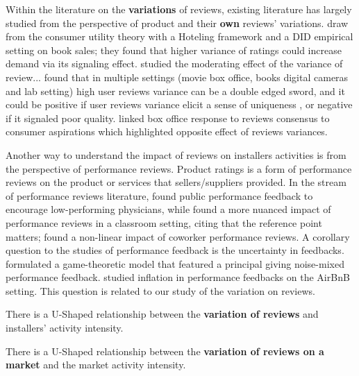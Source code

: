 \documentclass[mnsc,blindrev]{informs3} %
\begin{document}
Within the literature on the \textbf{variations} of reviews, existing literature has largely studied from the perspective of product and their \textbf{own} reviews' variations. \cite{sun2012does} draw from the consumer utility theory with a Hoteling framework and a DID empirical setting on book sales; they found that higher variance of ratings could increase demand via its signaling effect. \cite{yi2019leveraging} studied the moderating effect of the variance of review... \cite{wang2015user} found that in multiple settings (movie box office, books  digital cameras and lab setting) high user reviews variance can be a double edged sword, and it could be positive if user reviews variance elicit a sense of uniqueness , or negative if it signaled poor quality. \cite{west1998integrating} linked box office response to reviews consensus to consumer aspirations which highlighted opposite effect of reviews variances.  

Another way to understand the impact of reviews on installers activities is from the perspective of performance reviews.  Product ratings is a form of performance reviews on the product or services that sellers/suppliers provided. In the stream of performance reviews literature, \cite{song2017closing} found public performance feedback to encourage low-performing physicians, while \cite{eyring2018performance} found a more nuanced impact of performance reviews in a classroom setting, citing that the reference point matters;  \cite{tan2019you} found a non-linear impact of coworker performance reviews. 
A corollary question to the studies of performance feedback is the uncertainty in feedbacks. \cite{marinovic2015credibility} formulated a game-theoretic model that featured a principal giving noise-mixed performance feedback. \cite{bolton2019inflated} studied inflation in performance feedbacks on the AirBnB setting. This question is related to our study of the variation on reviews. 
 \begin{hypothesis}
There is a U-Shaped relationship between the \textbf{variation of reviews} and installers' activity intensity. 
\end{hypothesis}

 \begin{hypothesis}
There is a U-Shaped relationship between the \textbf{variation of reviews on a market} and the market activity intensity. 
\end{hypothesis}
 
%
%
\end{document}
